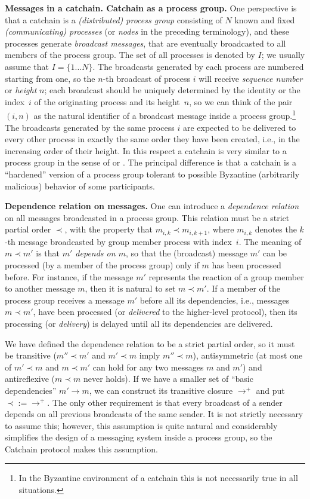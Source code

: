 \documentclass[12pt,oneside]{article}
\def\makepoint#1{\medbreak\noindent{\bf #1.\ }}
\def\nxpoint{\refstepcounter{subsection}%
  \smallbreak\makepoint{\thesubsection}}
\def\nxsubpoint{\refstepcounter{subsubsection}%
  \smallbreak\makepoint{\thesubsubsection}}
\def\emb#1{\textbf{#1.}}
\begin{document}
\nxpoint\emb{Messages in a catchain. Catchain as a process group}
One perspective is that a catchain is a {\em (distributed) process group\/} consisting of $N$ known and fixed {\em (communicating) processes\/} (or {\em nodes\/} in the preceding terminology), and these processes generate {\em broadcast messages}, that are eventually broadcasted to all members of the process group. The set of all processes is denoted by $I$; we usually assume that $I=\{1\ldots N\}$. The broadcasts generated by each process are numbered starting from one, so the $n$-th broadcast of process $i$ will receive {\em sequence number\/} or {\em height\/} $n$; each broadcast should be uniquely determined by the identity or the index~$i$ of the originating process and its height~$n$, so we can think of the pair $(i,n)$ as the natural identifier of a broadcast message inside a process group.\footnote{In the Byzantine environment of a catchain this is not necessarily true in all situations.} The broadcasts generated by the same process $i$ are expected to be delivered to every other process in exactly the same order they have been created, i.e., in the increasing order of their height. In this respect a catchain is very similar to a process group in the sense of \cite{Birman} or \cite{DistrSys}. The principal difference is that a catchain is a ``hardened'' version of a process group tolerant to possible Byzantine (arbitrarily malicious) behavior of some participants.

\nxsubpoint\emb{Dependence relation on messages}
One can introduce a {\em dependence relation\/} on all messages broadcasted in a process group. This relation must be a strict partial order $\prec$, with the property that $m_{i,k}\prec m_{i,k+1}$, where $m_{i,k}$ denotes the $k$-th message broadcasted by group member process with index~$i$. The meaning of $m\prec m'$ is that {\em $m'$ depends on $m$}, so that the (broadcast) message $m'$ can be processed (by a member of the process group) only if $m$ has been processed before. For instance, if the message $m'$ represents the reaction of a group member to another message $m$, then it is natural to set $m\prec m'$. If a member of the process group receives a message $m'$ before all its dependencies, i.e., messages $m\prec m'$, have been processed (or {\em delivered\/} to the higher-level protocol), then its processing (or {\em delivery\/}) is delayed until all its dependencies are delivered.

We have defined the dependence relation to be a strict partial order, so it must be transitive ($m''\prec m'$ and $m'\prec m$ imply $m''\prec m$), antisymmetric (at most one of $m'\prec m$ and $m\prec m'$ can hold for any two messages $m$ and $m'$) and antireflexive ($m\prec m$ never holds). If we have a smaller set of ``basic dependencies'' $m'\to m$, we can construct its transitive closure $\to^+$ and put $\prec:=\to^+$. The only other requirement is that every broadcast of a sender depends on all previous broadcasts of the same sender. It is not strictly necessary to assume this; however, this assumption is quite natural and considerably simplifies the design of a messaging system inside a process group, so the Catchain protocol makes this assumption.
\end{document}
